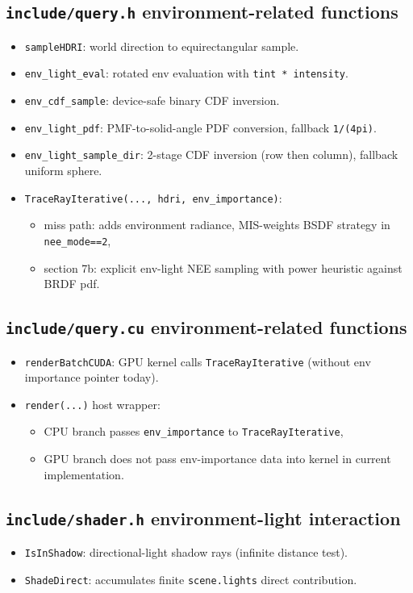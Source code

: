 \documentclass[11pt]{article}
\begin{document}
\subsection{\texttt{include/query.h} environment-related functions}
\begin{itemize}[leftmargin=1.5em]
  \item \verb|sampleHDRI|: world direction to equirectangular sample.
  \item \verb|env_light_eval|: rotated env evaluation with \verb|tint * intensity|.
  \item \verb|env_cdf_sample|: device-safe binary CDF inversion.
  \item \verb|env_light_pdf|: PMF-to-solid-angle PDF conversion, fallback \verb|1/(4pi)|.
  \item \verb|env_light_sample_dir|: 2-stage CDF inversion (row then column), fallback uniform sphere.
  \item \verb|TraceRayIterative(..., hdri, env_importance)|:
  \begin{itemize}
    \item miss path: adds environment radiance, MIS-weights BSDF strategy in \verb|nee_mode==2|,
    \item section 7b: explicit env-light NEE sampling with power heuristic against BRDF pdf.
  \end{itemize}
\end{itemize}

\subsection{\texttt{include/query.cu} environment-related functions}
\begin{itemize}[leftmargin=1.5em]
  \item \verb|renderBatchCUDA|: GPU kernel calls \verb|TraceRayIterative| (without env importance pointer today).
  \item \verb|render(...)| host wrapper:
  \begin{itemize}
    \item CPU branch passes \verb|env_importance| to \verb|TraceRayIterative|,
    \item GPU branch does not pass env-importance data into kernel in current implementation.
  \end{itemize}
\end{itemize}

\subsection{\texttt{include/shader.h} environment-light interaction}
\begin{itemize}[leftmargin=1.5em]
  \item \verb|IsInShadow|: directional-light shadow rays (infinite distance test).
  \item \verb|ShadeDirect|: accumulates finite \verb|scene.lights| direct contribution.
\end{itemize}
\end{document}

